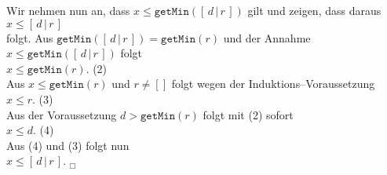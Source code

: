 \documentclass{article}
\begin{document}
\begin{enumerate}
      Wir nehmen nun an, dass  $x \leq \mathtt{getMin}([\,d\,|\,r\,])$ gilt und zeigen,
      dass daraus \\[0.1cm]
      \hspace*{1.3cm}  $x \leq [\,d\,|\,r\,]$  \\[0.1cm]
      folgt.  Aus $\mathtt{getMin}([\,d\,|\,r\,]) = \mathtt{getMin}(r)$ und der Annahme
        $x \leq \mathtt{getMin}([\,d\,|\,r\,])$ folgt \\[0.1cm]
       \hspace*{1.3cm} $x \leq \mathtt{getMin}(r)$. \hspace*{\fill} (2) \\[0.1cm]
      Aus  $x \leq \mathtt{getMin}(r)$ und $r \not= []$ folgt wegen der
      Induktions--Voraussetzung \\[0.1cm]
      \hspace*{1.3cm} $x \leq r$. \hspace*{\fill} (3) \\[0.1cm]
      Aus der Voraussetzung $d > \mathtt{getMin}(r)$ folgt mit (2) sofort \\[0.1cm]
      \hspace*{1.3cm} $x \leq d$. \hspace*{\fill} (4) \\[0.1cm]
      Aus (4) und (3) folgt nun \\[0.1cm]
      \hspace*{1.3cm} $x \leq [\,d\,|\,r\,]$. \hspace*{\fill} $_\Box$
\end{enumerate}
\end{document}
